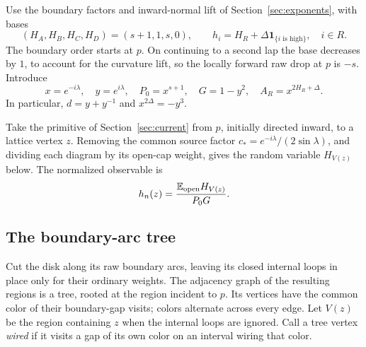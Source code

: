 Use the boundary factors and inward-normal lift of
Section~\ref{sec:exponents}, with bases
\begin{equation}
 (H_A,H_B,H_C,H_D)=(s+1,1,s,0),\qquad
 h_i=H_R+\Delta\mathbf1_{\{i\text{ is high}\}},\quad i\in R.
 \label{four:bases}
\end{equation}
The boundary order starts at $p$.  On continuing to a second lap the
base decreases by $1$, to account for the curvature lift, so the locally
forward raw drop at $p$ is $-s$.  Introduce
\begin{equation}
 x=e^{-i\lambda},\quad y=e^{i\lambda},\quad
 P_0=x^{s+1},\quad G=1-y^2,\quad A_R=x^{2H_R+\Delta}.
 \label{four:normalization}
\end{equation}
In particular, $d=y+y^{-1}$ and $x^{2\Delta}=-y^3$.

Take the primitive of Section~\ref{sec:current} from $p$, initially
directed inward, to a lattice vertex $z$.  Removing the common source
factor $c_*=e^{-i\lambda}/(2\sin\lambda)$, and dividing each diagram by
its open-cap weight, gives the random variable $H_{V(z)}$ below.  The
normalized observable is
\begin{equation}
 h_n(z)=\frac{\mathbb E_{\rm open}H_{V(z)}}{P_0G}.
 \label{four:observable}
\end{equation}

\subsection{The boundary-arc tree}

Cut the disk along its raw boundary arcs, leaving its closed internal
loops in place only for their ordinary weights.  The adjacency graph of
the resulting regions is a tree, rooted at the region incident to $p$.
Its vertices have the common color of their boundary-gap visits; colors
alternate across every edge.  Let $V(z)$ be the region containing $z$
when the internal loops are ignored.  Call a tree vertex \emph{wired}
if it visits a gap of its own color on an interval wiring that color.

